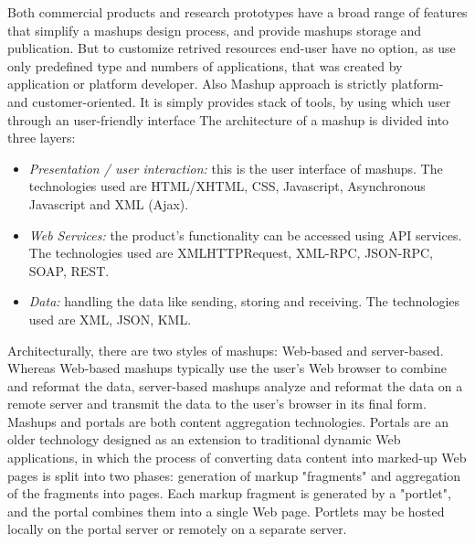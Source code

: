 Both commercial products and research prototypes have a broad range of features that simplify a mashups design process, and provide mashups storage and publication. But to customize retrived resources end-user have no option, as use only predefined type and numbers of applications, that was created by application or platform developer. Also Mashup approach is strictly platform- and customer-oriented. It is simply provides stack of tools, by using which user through an user-friendly interface 
The architecture of a mashup is divided into three layers:
 \newline
 \begin{itemize}
\item \emph {Presentation / user interaction:} this is the user interface of mashups. The technologies used are HTML/XHTML, CSS, Javascript, Asynchronous Javascript and XML (Ajax).
 \newline
\item \emph {Web Services:} the product's functionality can be accessed using API services. The technologies used are XMLHTTPRequest, XML-RPC, JSON-RPC, SOAP, REST.
 \newline
\item \emph {Data:} handling the data like sending, storing and receiving. The technologies used are XML, JSON, KML.
 \newline
 \end{itemize}
Architecturally, there are two styles of mashups: Web-based and server-based. Whereas Web-based mashups typically use the user's Web browser to combine and reformat the data, server-based mashups analyze and reformat the data on a remote server and transmit the data to the user's browser in its final form\cite{bolin2005end}.
 \newline
Mashups and portals are both content aggregation technologies. Portals are an older technology designed as an extension to traditional dynamic Web applications, in which the process of converting data content into marked-up Web pages is split into two phases: generation of markup "fragments" and aggregation of the fragments into pages. Each markup fragment is generated by a "portlet", and the portal combines them into a single Web page. Portlets may be hosted locally on the portal server or remotely on a separate server.
\newline
